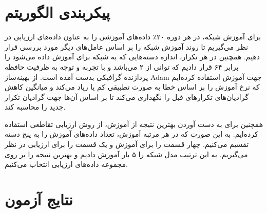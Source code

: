 \section{پیکربندی الگوریتم}
برای آموزش شبکه‌، در هر دوره ۲۰٪ داد‌ه‌های آموزشی را به عناون داده‌های ارزیابی  در نظر می‌گیریم تا روند آموزش شبکه را بر اساس عامل‌های دیگر مورد بررسی قرار دهیم. همچنین در هر تکرار، اندازه دسته‌هایی که به شبکه برای آموزش داده می‌شود را برابر ۶۴ قرار دادیم که توانی از ۲ می‌باشد و با تجربه و توجه به ظرفیت حافظه پردازنده گرافیکی بدست آمده است. از بهینه‌ساز Adam جهت آموزش استفاده کرده‌ایم که نرخ آموزش را بر اساس خطا به صورت تطبیقی کم یا زیاد می‌کند و میانگین کاهش گرادیان‌های تکرارهای قبل را نگهداری می‌کند تا بر اساس آن‌ها جهت گرادیان تکرار جدید را محاسبه کند.

\noindent
همچنین برای به دست آوردن بهترین نتیجه از آموزش، از روش ارزیابی تقاطعی استفاده کرده‌ایم. به این صورت که در هر مرتبه آموزش، تعداد داده‌های آموزش را به پنج دسته تقسیم می‌کنیم. چهار قسمت را برای آموزش و یک قسمت را برای ارزیابی در نظر می‌گیریم. به این ترتیب مدل شبکه را ۵ بار آموزش دادیم و بهترین نتیجه را بر روی مجموعه داده‌های ارزیابی انتخاب می‌کنیم.

\section{نتایج آزمون}
